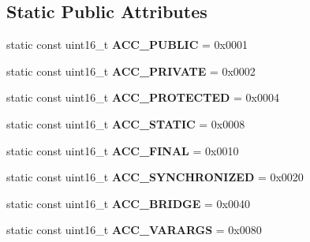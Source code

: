 \subsection*{Static Public Attributes}
\begin{DoxyCompactItemize}
\item 
static const uint16\+\_\+t {\bfseries A\+C\+C\+\_\+\+P\+U\+B\+L\+IC} = 0x0001\hypertarget{classMethodInfo_abbae7c130ce38e564ab064ffefaba1a9}{}\label{classMethodInfo_abbae7c130ce38e564ab064ffefaba1a9}

\item 
static const uint16\+\_\+t {\bfseries A\+C\+C\+\_\+\+P\+R\+I\+V\+A\+TE} = 0x0002\hypertarget{classMethodInfo_a19426ef6cac282430e33b01aca43b744}{}\label{classMethodInfo_a19426ef6cac282430e33b01aca43b744}

\item 
static const uint16\+\_\+t {\bfseries A\+C\+C\+\_\+\+P\+R\+O\+T\+E\+C\+T\+ED} = 0x0004\hypertarget{classMethodInfo_aaaeec63978f8a0b60802463b0e31f9ca}{}\label{classMethodInfo_aaaeec63978f8a0b60802463b0e31f9ca}

\item 
static const uint16\+\_\+t {\bfseries A\+C\+C\+\_\+\+S\+T\+A\+T\+IC} = 0x0008\hypertarget{classMethodInfo_a31fa80295cba67351bc39abc44ab1e34}{}\label{classMethodInfo_a31fa80295cba67351bc39abc44ab1e34}

\item 
static const uint16\+\_\+t {\bfseries A\+C\+C\+\_\+\+F\+I\+N\+AL} = 0x0010\hypertarget{classMethodInfo_a553f0a3214448afc4276f3626a1965de}{}\label{classMethodInfo_a553f0a3214448afc4276f3626a1965de}

\item 
static const uint16\+\_\+t {\bfseries A\+C\+C\+\_\+\+S\+Y\+N\+C\+H\+R\+O\+N\+I\+Z\+ED} = 0x0020\hypertarget{classMethodInfo_af931f19fe68af20eb0d5ed8997302033}{}\label{classMethodInfo_af931f19fe68af20eb0d5ed8997302033}

\item 
static const uint16\+\_\+t {\bfseries A\+C\+C\+\_\+\+B\+R\+I\+D\+GE} = 0x0040\hypertarget{classMethodInfo_a17e5cab8bb54ce7867404d480c410226}{}\label{classMethodInfo_a17e5cab8bb54ce7867404d480c410226}

\item 
static const uint16\+\_\+t {\bfseries A\+C\+C\+\_\+\+V\+A\+R\+A\+R\+GS} = 0x0080\hypertarget{classMethodInfo_a09b03b447bfbb32c99aa72b57fe45050}{}\label{classMethodInfo_a09b03b447bfbb32c99aa72b57fe45050}


\end{DoxyCompactItemize}
